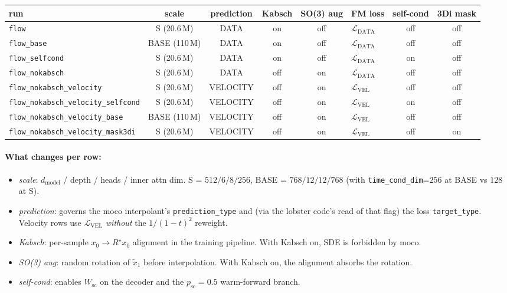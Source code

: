 \documentclass[11pt]{article}
\begin{document}
\renewcommand{\arraystretch}{1.15}
\begin{center}
\begin{tabular}{l c c c c l c c}
\toprule
\textbf{run} & \textbf{scale} & \textbf{prediction} & \textbf{Kabsch} & \textbf{SO(3) aug} & \textbf{FM loss} & \textbf{self-cond} & \textbf{3Di mask} \\
\midrule
\texttt{flow}                                  & S (20.6\,M)  & DATA     & on  & off & $\mathcal{L}_{\text{DATA}}$ & off & off \\
\texttt{flow\_base}                            & BASE (110\,M)& DATA     & on  & off & $\mathcal{L}_{\text{DATA}}$ & off & off \\
\texttt{flow\_selfcond}                        & S (20.6\,M)  & DATA     & on  & off & $\mathcal{L}_{\text{DATA}}$ & on  & off \\
\texttt{flow\_nokabsch}                        & S (20.6\,M)  & DATA     & off & on  & $\mathcal{L}_{\text{DATA}}$ & off & off \\
\texttt{flow\_nokabsch\_velocity}              & S (20.6\,M)  & VELOCITY & off & on  & $\mathcal{L}_{\text{VEL}}$  & off & off \\
\texttt{flow\_nokabsch\_velocity\_selfcond}    & S (20.6\,M)  & VELOCITY & off & on  & $\mathcal{L}_{\text{VEL}}$  & on  & off \\
\texttt{flow\_nokabsch\_velocity\_base}        & BASE (110\,M)& VELOCITY & off & on  & $\mathcal{L}_{\text{VEL}}$  & off & off \\
\texttt{flow\_nokabsch\_velocity\_mask3di}     & S (20.6\,M)  & VELOCITY & off & on  & $\mathcal{L}_{\text{VEL}}$  & off & on  \\
\bottomrule
\end{tabular}
\end{center}

\paragraph{What changes per row:}
\begin{itemize}\itemsep -1pt
\item \emph{scale}: $d_\text{model}$ / depth / heads / inner attn dim. S = $512/6/8/256$, BASE = $768/12/12/768$ (with \texttt{time\_cond\_dim}=$256$ at BASE vs $128$ at S).
\item \emph{prediction}: governs the moco interpolant's \texttt{prediction\_type} and (via the lobster code's read of that flag) the loss \texttt{target\_type}. Velocity rows use $\mathcal{L}_{\text{VEL}}$ \emph{without} the $1/(1-t)^2$ reweight.
\item \emph{Kabsch}: per-sample $x_0 \to R^\star x_0$ alignment in the training pipeline. With Kabsch on, SDE is forbidden by moco.
\item \emph{SO(3) aug}: random rotation of $\tilde x_1$ before interpolation. With Kabsch on, the alignment absorbs the rotation.
\item \emph{self-cond}: enables $W_{\text{sc}}$ on the decoder and the $p_{\text{sc}}=0.5$ warm-forward branch.
\end{itemize}
\end{document}
